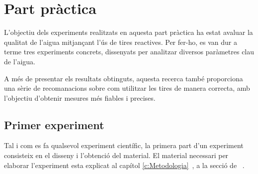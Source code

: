 \chapter{Part pràctica}
\label{c:Partpra}

L’objectiu dels experiments realitzats en aquesta part pràctica ha estat avaluar la qualitat de l’aigua mitjançant l’ús de tires reactives. Per fer-ho, es van dur a terme tres experiments concrets, dissenyats per analitzar diversos paràmetres clau de l’aigua.

A més de presentar els resultats obtinguts, aquesta recerca també proporciona una sèrie de recomanacions sobre com utilitzar les tires de manera correcta, amb l’objectiu d’obtenir mesures més fiables i precises.


\section{Primer experiment}


Tal i com es fa qualsevol experiment científic, la primera part d'un experiment consisteix en el disseny i l'obtenció del material. El material necessari per elaborar l'experiment esta explicat al capítol \ref{c:Metodologia}~, a la secció de ~.



